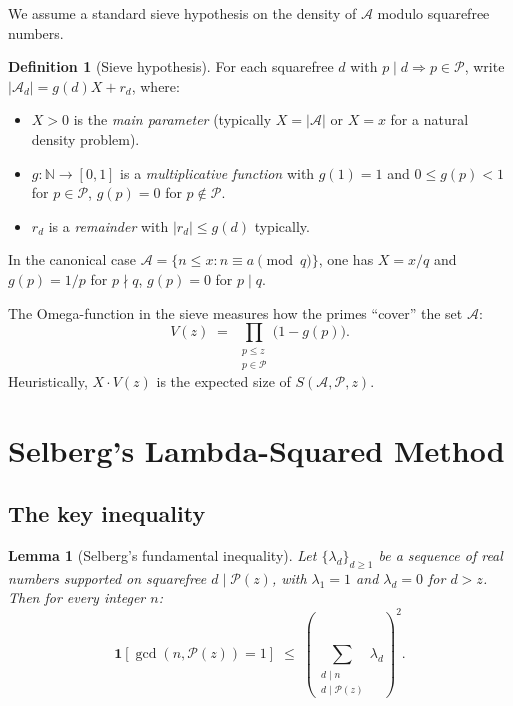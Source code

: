 \documentclass[12pt,a4paper]{amsart}
\newtheorem{lemma}[theorem]{Lemma}
\theoremstyle{definition}
\newtheorem{definition}[theorem]{Definition}
\newcommand{\N}{\mathbb{N}}
\begin{document}
We assume a standard sieve hypothesis on the density of $\mathcal{A}$
modulo squarefree numbers.

\begin{definition}[Sieve hypothesis]\label{def:hypothesis}
  For each squarefree $d$ with $p \mid d \Rightarrow p \in \mathcal{P}$,
  write $|\mathcal{A}_d| = g(d) X + r_d$, where:
  \begin{itemize}
    \item $X > 0$ is the \emph{main parameter} (typically $X = |\mathcal{A}|$
      or $X = x$ for a natural density problem).
    \item $g : \N \to [0, 1]$ is a \emph{multiplicative function} with
      $g(1) = 1$ and $0 \leq g(p) < 1$ for $p \in \mathcal{P}$, $g(p) = 0$
      for $p \notin \mathcal{P}$.
    \item $r_d$ is a \emph{remainder} with $|r_d| \leq g(d)$ typically.
  \end{itemize}
  In the canonical case $\mathcal{A} = \{n \leq x : n \equiv a \pmod q\}$,
  one has $X = x/q$ and $g(p) = 1/p$ for $p \nmid q$, $g(p) = 0$ for $p \mid q$.
\end{definition}

The Omega-function in the sieve measures how the primes ``cover'' the set $\mathcal{A}$:
\begin{equation}\label{eq:omega}
  V(z) \;=\; \prod_{\substack{p \leq z \\ p \in \mathcal{P}}} \bigl(1 - g(p)\bigr).
\end{equation}
Heuristically, $X \cdot V(z)$ is the expected size of $S(\mathcal{A},\mathcal{P},z)$.

\section{Selberg's Lambda-Squared Method}
\label{sec:selberg}

\subsection{The key inequality}

\begin{lemma}[Selberg's fundamental inequality]\label{lem:selberg_key}
  Let $\{\lambda_d\}_{d \geq 1}$ be a sequence of real numbers supported
  on squarefree $d \mid \mathcal{P}(z)$, with $\lambda_1 = 1$ and
  $\lambda_d = 0$ for $d > z$.  Then for every integer $n$:
  \[
    \mathbf{1}[\gcd(n, \mathcal{P}(z)) = 1]
    \;\leq\; \left(\sum_{\substack{d \mid n \\ d \mid \mathcal{P}(z)}} \lambda_d\right)^2.
  \]
\end{lemma}
\end{document}
